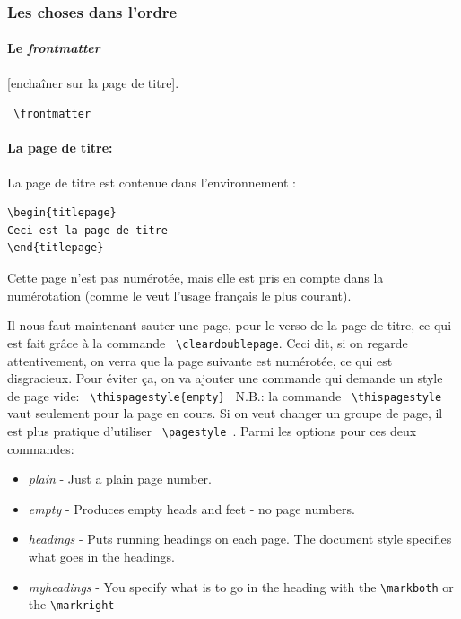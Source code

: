 \documentclass[a4paper,twoside,french,12pt]{article}
\begin{document}
\subsubsection{Les choses dans l'ordre}

\paragraph{Le \textit{frontmatter}} [enchaîner sur la page de titre].

\verb= \frontmatter=\\

\paragraph{La page de titre:}

La page de titre est contenue dans l'environnement :
\begin{verbatim}
\begin{titlepage}
Ceci est la page de titre
\end{titlepage}
\end{verbatim}

Cette page n'est pas numérotée, mais elle est pris en compte dans la numérotation (comme le veut l'usage français le plus courant).

Il nous faut maintenant sauter une page, pour le verso de la page de titre, ce qui est fait grâce à la commande \verb= \cleardoublepage=.
Ceci dit, si on regarde attentivement, on verra que la page suivante est numérotée, ce qui est disgracieux. Pour éviter ça, on va ajouter une commande qui demande un style de page vide: \verb= \thispagestyle{empty} =
N.B.: la commande \verb= \thispagestyle= vaut seulement pour la page en cours. Si on veut changer un groupe de page, il est plus pratique d'utiliser \verb= \pagestyle =. Parmi les options pour ces deux commandes:

\begin{itemize}
\item \textit{plain} - Just a plain page number.
\item \textit{empty} - Produces empty heads and feet - no page numbers.
\item \textit{headings} - Puts running headings on each page. The document style specifies what goes in the headings.
\item \textit{myheadings} - You specify what is to go in the heading with the \verb=\markboth= or the \verb=\markright=
\end{itemize}
\end{document}
